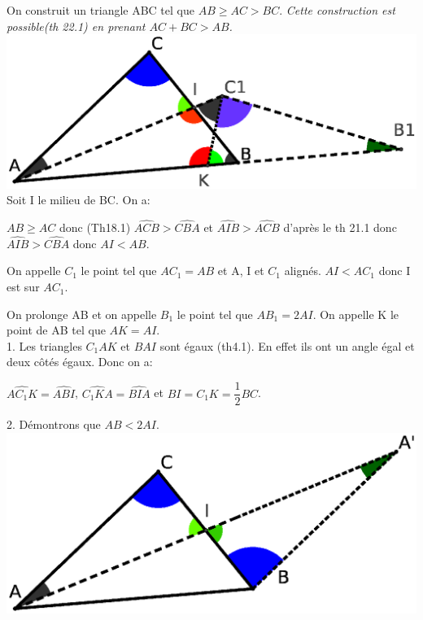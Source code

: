 \documentclass[a4paper, 12pt, twoside]{book}
\begin{document}
 On construit un triangle ABC tel que $AB\geq AC>BC$. \textit{Cette construction est possible(th 22.1) en prenant $AC+BC>AB$.} \\
 

 
   \includegraphics[scale=0.5]{figures/Legendre1.eps} \\
   
    Soit I le milieu de BC. On a:\
    
    $AB\geq AC$ donc (Th18.1) $\hat{ACB}>\hat{CBA}$ et  $\hat{AIB}>\hat{ACB}$  d'après le th 21.1 donc  $\hat{AIB}>\hat{CBA}$ donc $AI<AB$.\
 
  On appelle $C_{1}$ le point  tel que $AC_{1}=AB$ et A, I et $C_{1}$ alignés. $AI<AC_{1}$ donc I est sur $AC_{1}$.
  
  On prolonge AB et on appelle $B_{1}$ le point tel que $AB_{1}=2AI$. On appelle K le point de AB tel que $AK=AI$.\\
  

  
  1. Les triangles $C_{1}AK$ et $BAI$ sont égaux (th4.1). En effet ils ont un angle égal et deux côtés égaux. Donc on a:\
  
   $\hat{AC_{1}K}=\hat{ABI}$,  $\hat{C_{1}KA}=\hat{BIA}$ et $BI=C_{1}K=\dfrac{1}{2}BC$.\
   
 2. Démontrons que $AB<2AI$.\\
  
     \includegraphics[scale=0.4]{figures/Legendre2.eps} \\
     
\end{document}
